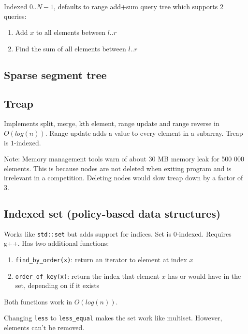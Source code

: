 \documentclass{article}
\begin{document}
Indexed $0$..$N-1$, defaults to range add+sum query tree which supports 2 queries:
\begin{enumerate}
	\item Add $x$ to all elements between $l$..$r$
	\item Find the sum of all elements between $l$..$r$
\end{enumerate}



\subsection {Sparse segment tree}

\subsection {Treap}

Implements split, merge, kth element, range update and range reverse in $O(log(n))$. Range update adds a value to every element in a subarray. Treap is $1$-indexed.

Note: Memory management tools warn of about 30 MB memory leak for 500 000 elements. This is because nodes are not deleted when exiting program and is irrelevant in a competition. Deleting nodes would slow treap down by a factor of 3.



\subsection {Indexed set (policy-based data structures)}

Works like \texttt{std::set} but adds support for indices. Set is 0-indexed. Requires g++. Has two additional functions:

\begin{enumerate}
	\item \verb|find_by_order(x)|: return an iterator to element at index $x$
	\item \verb|order_of_key(x)|: return the index that element $x$ has or would have in the set, depending on if it exists
\end{enumerate}

Both functions work in $O(log(n))$.

Changing \texttt{less} to \verb|less_equal| makes the set work like multiset. However, elements can't be removed.
\end{document}
